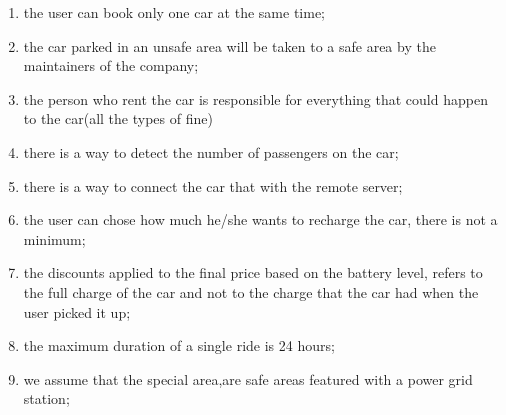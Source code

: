 \begin{enumerate}
	\item the user can book only one car at the same time;
	\item the car parked in an unsafe area will be taken to a safe area by the maintainers of the company;
	\item the person who rent the car is responsible for everything that could happen to the car(all the types of fine)
	\item there is a way to detect the number of passengers on the car;
	\item there is a way to connect the car  that with the remote server;
	\item the user can chose how much he/she wants to recharge the car, there is not a minimum;
	\item the discounts applied to the final price based on the battery level, refers to the full charge of the car and not to the charge that the car had when the user picked it up;
	\item the maximum duration of a single ride is 24 hours;
	\item we assume that the special area,are safe areas featured with a power grid station;
\end{enumerate}